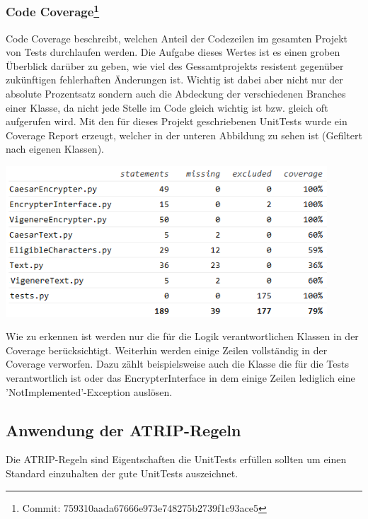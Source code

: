 \documentclass[12pt]{article}
\begin{document}
\subsubsection[Code Coverage]{Code Coverage\protect\footnote{Commit: 759310aada67666e973e748275b2739f1c93ace5}}
Code Coverage beschreibt, welchen Anteil der Codezeilen im gesamten Projekt von Tests durchlaufen werden. Die Aufgabe dieses Wertes ist es einen groben Überblick darüber zu geben, wie viel des Gessamtprojekts resistent gegenüber zukünftigen fehlerhaften Änderungen ist. Wichtig ist dabei aber nicht nur der absolute Prozentsatz sondern auch die Abdeckung der verschiedenen Branches einer Klasse, da nicht jede Stelle im Code gleich wichtig ist bzw. gleich oft aufgerufen wird. Mit den für dieses Projekt geschriebenen UnitTests wurde ein Coverage Report erzeugt, welcher in der unteren Abbildung zu sehen ist (Gefiltert nach eigenen Klassen).
\begin{center}
	\includegraphics[width=12cm]{bilder/Coverage.png}
\end{center}
Wie zu erkennen ist werden nur die für die Logik verantwortlichen Klassen in der Coverage berücksichtigt. Weiterhin werden einige Zeilen vollständig in der Coverage verworfen. Dazu zählt beispielsweise auch die Klasse die für die Tests verantwortlich ist oder das EncrypterInterface in dem einige Zeilen lediglich eine 'NotImplemented'-Exception auslösen.
\subsection{Anwendung der ATRIP-Regeln}
Die ATRIP-Regeln sind Eigentschaften die UnitTests erfüllen sollten um einen Standard einzuhalten der gute UnitTests auszeichnet.
\end{document}

